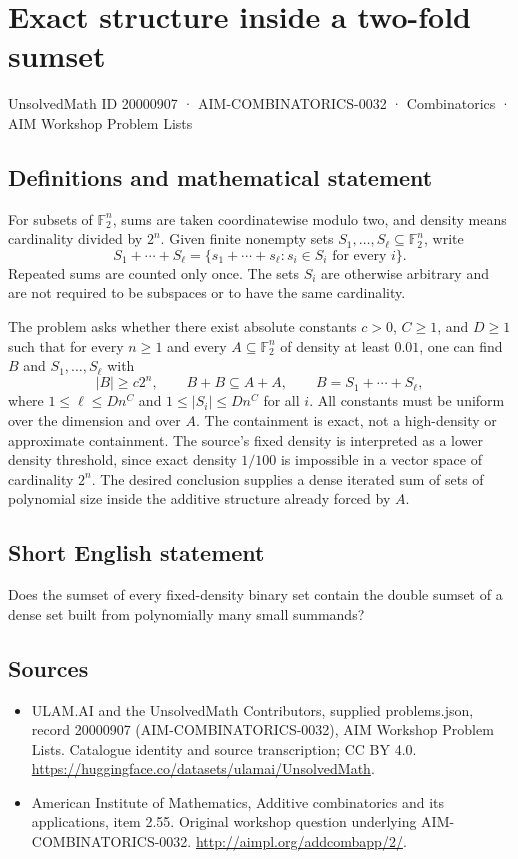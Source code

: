 \documentclass[11pt,a4paper]{article}
\begin{document}
\section*{Exact structure inside a two-fold sumset}\label{20000907}
{\small UnsolvedMath ID 20000907 · AIM-COMBINATORICS-0032 · Combinatorics · AIM Workshop Problem Lists}
\subsection{Definitions and mathematical statement}
For subsets of $\mathbb F_2^n$, sums are taken coordinatewise modulo two, and density means cardinality divided by $2^n$.
Given finite nonempty sets $S_1,\ldots,S_\ell\subseteq\mathbb F_2^n$, write
\[
 S_1+\cdots+S_\ell
 =\{s_1+\cdots+s_\ell:s_i\in S_i\text{ for every }i\}.
\]
Repeated sums are counted only once.
The sets $S_i$ are otherwise arbitrary and are not required to be subspaces or to have the same cardinality.

The problem asks whether there exist absolute constants $c>0$, $C\geq1$, and $D\geq1$ such that for every $n\geq1$ and every $A\subseteq\mathbb F_2^n$ of density at least $0.01$, one can find $B$ and $S_1,\ldots,S_\ell$ with
\[
 |B|\geq c2^n,\qquad B+B\subseteq A+A,\qquad
 B=S_1+\cdots+S_\ell,
\]
where $1\leq\ell\leq Dn^C$ and $1\leq|S_i|\leq Dn^C$ for all $i$.
All constants must be uniform over the dimension and over $A$.
The containment is exact, not a high-density or approximate containment.
The source's fixed density is interpreted as a lower density threshold, since exact density $1/100$ is impossible in a vector space of cardinality $2^n$.
The desired conclusion supplies a dense iterated sum of sets of polynomial size inside the additive structure already forced by $A$.
\subsection{Short English statement}
Does the sumset of every fixed-density binary set contain the double sumset of a dense set built from polynomially many small summands?
\subsection{Sources}
\begin{itemize}
\item[S1] ULAM.AI and the UnsolvedMath Contributors, supplied problems.json, record 20000907 (AIM-COMBINATORICS-0032), AIM Workshop Problem Lists. Catalogue identity and source transcription; CC BY 4.0.
\url{https://huggingface.co/datasets/ulamai/UnsolvedMath}.
\item[S2] American Institute of Mathematics, Additive combinatorics and its applications, item 2.55. Original workshop question underlying AIM-COMBINATORICS-0032.
\url{http://aimpl.org/addcombapp/2/}.
\end{itemize}
\end{document}
